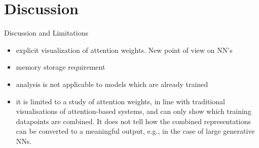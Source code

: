 \documentclass{beamer}
\begin{document}
\section{Discussion}

\begin{frame}{Discussion and Limitations}
    \begin{itemize}
        \item explicit visualization of attention weights. New point of view on NN's
        \item memory storage requirement
        \item analysis is not applicable to models which are already trained
        \item it is limited to a study of attention weights, in line with traditional visualisations of attention-based systems, and can only show which training datapoints are combined. It does not tell how the combined representations can be converted to a meaningful output, e.g., in the case of large generative NNs.
    \end{itemize}
\end{frame}
\end{document}
